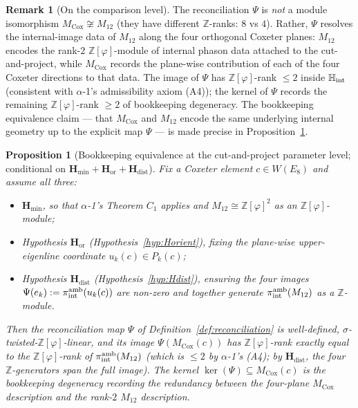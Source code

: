 \documentclass[11pt, a4paper]{amsart}
\newtheorem{proposition}[theorem]{Proposition}
\theoremstyle{definition}
\newtheorem{remark}[theorem]{Remark}
\newcommand{\Z}{\mathbb{Z}}
\newcommand{\HH}{\mathbb{H}}
\newcommand{\Hmin}{\mathbf{H}_{\min}}
\newcommand{\Hor}{\mathbf{H}_{\mathrm{or}}}
\newcommand{\Hdist}{\mathbf{H}_{\mathrm{dist}}}
\newcommand{\Ophi}{\mathbb{Z}[\varphi]}
\newcommand{\Mcox}{M_{\mathrm{Cox}}}
\newcommand{\Mtw}{M_{12}}
\begin{document}
\begin{remark}[On the comparison level]
\label{rmk:reconciliation-level}
The reconciliation $\Psi$ is \emph{not} a module isomorphism
$\Mcox \not\cong \Mtw$ (they have different $\Z$-ranks: $8$
vs $4$). Rather, $\Psi$ resolves the internal-image data of
$\Mtw$ along the four orthogonal Coxeter planes: $\Mtw$
encodes the rank-$2$ $\Ophi$-module of internal phason data
attached to the cut-and-project, while $\Mcox$ records the
plane-wise contribution of each of the four Coxeter
directions to that data. The image of $\Psi$ has $\Ophi$-rank
$\leq 2$ inside $\HH_{\rm int}$ (consistent with $\alpha$-1's
admissibility axiom (A4)); the kernel of $\Psi$ records the
remaining $\Ophi$-rank $\geq 2$ of bookkeeping degeneracy.
The bookkeeping equivalence claim --- that $\Mcox$ and $\Mtw$
encode the same underlying internal geometry up to the
explicit map $\Psi$ --- is made precise in
Proposition~\ref{prop:reconciliation}.
\end{remark}

\begin{proposition}[Bookkeeping equivalence at the
  cut-and-project parameter level; conditional on $\Hmin
  + \Hor + \Hdist$]
\label{prop:reconciliation}
Fix a Coxeter element $c \in W(E_8)$ and assume all three:
\begin{itemize}
\item $\Hmin$, so that $\alpha$-1's Theorem $C_1$ applies
  and $\Mtw \cong \Ophi^{2}$ as an $\Ophi$-module;
\item Hypothesis $\Hor$ (Hypothesis~\ref{hyp:Horient}),
  fixing the plane-wise upper-eigenline coordinate
  $u_k(c) \in P_k(c)$;
\item Hypothesis $\Hdist$ (Hypothesis~\ref{hyp:Hdist}),
  ensuring the four images $\Psi(e_k) := \pi_{\rm int}^{\rm
  amb}(u_k(c))$ are non-zero and together generate
  $\pi_{\rm int}^{\rm amb}(\Mtw)$ as a $\Z$-module.
\end{itemize}
Then the reconciliation map $\Psi$ of
Definition~\ref{def:reconciliation} is well-defined,
$\sigma$-twisted-$\Ophi$-linear, and its image
$\Psi(\Mcox(c))$ has $\Ophi$-rank exactly equal to the
$\Ophi$-rank of $\pi_{\rm int}^{\rm amb}(\Mtw)$ (which is
$\leq 2$ by $\alpha$-1's (A4); by $\Hdist$, the four
$\Z$-generators span the full image). The kernel
$\ker(\Psi) \subseteq \Mcox(c)$ is the bookkeeping
degeneracy recording the redundancy between the four-plane
$\Mcox$ description and the rank-$2$ $\Mtw$ description.
\end{proposition}
\end{document}
